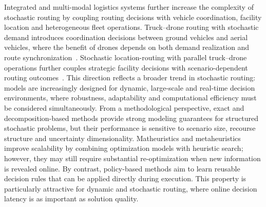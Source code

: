 \documentclass[pdflatex]{sn-jnl}
\begin{document}
Integrated and multi-modal logistics systems further increase the complexity of stochastic routing by coupling routing decisions with vehicle coordination, facility location and heterogeneous fleet operations. Truck--drone routing with stochastic demand introduces coordination decisions between ground vehicles and aerial vehicles, where the benefit of drones depends on both demand realization
and route synchronization~\cite{wang2025truck}. Stochastic location-routing with parallel truck--drone operations further couples strategic facility decisions with scenario-dependent routing outcomes~\cite{tureci2025stochastic}. This direction reflects a broader trend in stochastic routing: models are increasingly designed for dynamic, large-scale and real-time decision environments, where robustness, adaptability and computational efficiency must
be considered simultaneously. 
From a methodological perspective, exact and decomposition-based methods provide strong modeling guarantees for structured stochastic problems, but their performance is sensitive to scenario size, recourse structure and uncertainty dimensionality. Matheuristics and metaheuristics improve scalability by combining optimization models with heuristic search; however, they may still require substantial re-optimization when new information is revealed online. By
contrast, policy-based methods aim to learn reusable decision rules that can be applied directly during execution. This property is particularly attractive for dynamic and stochastic routing, where online decision latency is as important as solution quality.

\end{document}
